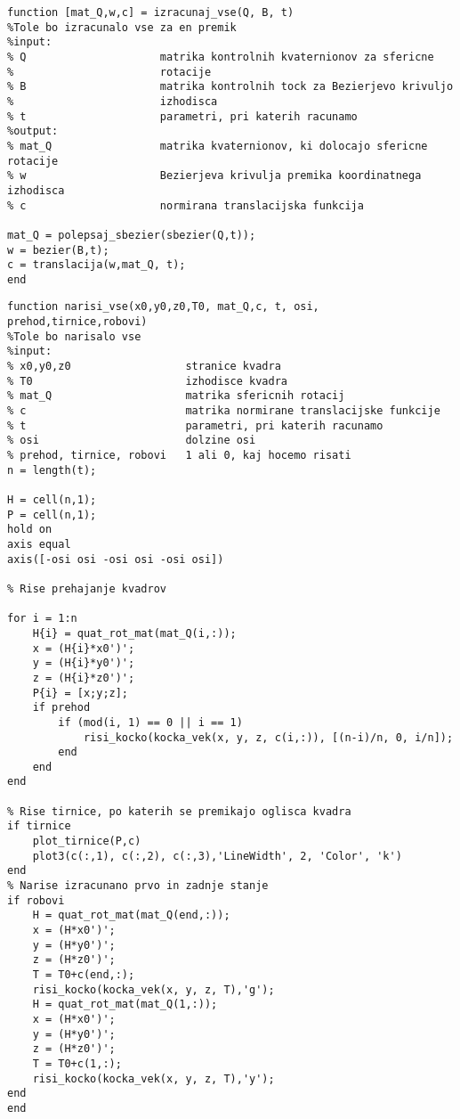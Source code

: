 \documentclass[12pt,a4paper,twoside]{article}
\theoremstyle{definition} %
\theoremstyle{plain} %
\numberwithin{equation}{section}  %
\begin{document}
\begin{lstlisting}[caption = {izracunaj\_vse}]
function [mat_Q,w,c] = izracunaj_vse(Q, B, t)
%Tole bo izracunalo vse za en premik
%input:
% Q                     matrika kontrolnih kvaternionov za sfericne
%                       rotacije
% B                     matrika kontrolnih tock za Bezierjevo krivuljo
%                       izhodisca
% t                     parametri, pri katerih racunamo
%output:
% mat_Q                 matrika kvaternionov, ki dolocajo sfericne rotacije
% w                     Bezierjeva krivulja premika koordinatnega izhodisca
% c                     normirana translacijska funkcija

mat_Q = polepsaj_sbezier(sbezier(Q,t));
w = bezier(B,t);
c = translacija(w,mat_Q, t);
end
\end{lstlisting}


\begin{lstlisting}[caption = {narisi\_vse}]
function narisi_vse(x0,y0,z0,T0, mat_Q,c, t, osi, prehod,tirnice,robovi)
%Tole bo narisalo vse
%input:
% x0,y0,z0                  stranice kvadra
% T0                        izhodisce kvadra
% mat_Q                     matrika sfericnih rotacij
% c                         matrika normirane translacijske funkcije
% t                         parametri, pri katerih racunamo
% osi                       dolzine osi
% prehod, tirnice, robovi   1 ali 0, kaj hocemo risati
n = length(t);

H = cell(n,1);
P = cell(n,1);
hold on
axis equal
axis([-osi osi -osi osi -osi osi])

% Rise prehajanje kvadrov

for i = 1:n
    H{i} = quat_rot_mat(mat_Q(i,:));
    x = (H{i}*x0')';
    y = (H{i}*y0')';
    z = (H{i}*z0')';
    P{i} = [x;y;z];
    if prehod
        if (mod(i, 1) == 0 || i == 1)
            risi_kocko(kocka_vek(x, y, z, c(i,:)), [(n-i)/n, 0, i/n]);
        end
    end
end

% Rise tirnice, po katerih se premikajo oglisca kvadra
if tirnice
    plot_tirnice(P,c)
    plot3(c(:,1), c(:,2), c(:,3),'LineWidth', 2, 'Color', 'k')
end
% Narise izracunano prvo in zadnje stanje
if robovi
    H = quat_rot_mat(mat_Q(end,:));
    x = (H*x0')';
    y = (H*y0')';
    z = (H*z0')';
    T = T0+c(end,:);
    risi_kocko(kocka_vek(x, y, z, T),'g');
    H = quat_rot_mat(mat_Q(1,:));
    x = (H*x0')';
    y = (H*y0')';
    z = (H*z0')';
    T = T0+c(1,:);
    risi_kocko(kocka_vek(x, y, z, T),'y');
end
end
\end{lstlisting}
\end{document}
